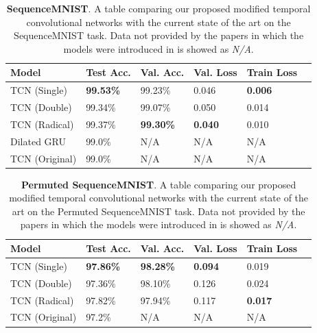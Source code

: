 \documentclass[a4paper, twoside]{article}
\begin{document}
\begin{table}[h]
\begin{center}
    \begin{tabular}{| l | l | l | l | l | l |}
    \hline
    Model & Test Acc. & Val. Acc. & Val. Loss & Train Loss\\ \hline \hline
    TCN (Single) & \textbf{99.53\%} & 99.23\% & 0.046 & \textbf{0.006} \\ \hline
    TCN (Double) & 99.34\% & 99.07\% & 0.050 & 0.014 \\ \hline
    TCN (Radical) & 99.37\% & \textbf{99.30\%} & \textbf{0.040} & 0.010 \\ \hline
    Dilated GRU \cite{dilatedgru} & 99.0\% & N/A & N/A & N/A \\ \hline
    TCN (Original) \cite{tcn} & 99.0\% & N/A & N/A & N/A \\ \hline
    \end{tabular}
    \caption{\textbf{SequenceMNIST}. A table comparing our proposed modified temporal convolutional networks with the current state of the art on the SequenceMNIST task. Data not provided by the papers in which the models were introduced in is showed as \textit{N/A}.} \label{tabseqmnist}
\end{center}
\end{table}

\begin{table}[h]
\begin{center}
    \begin{tabular}{| l | l | l | l | l | l |}
    \hline
    Model & Test Acc. & Val. Acc. & Val. Loss & Train Loss\\ \hline \hline
    TCN (Single) & \textbf{97.86\%} & \textbf{98.28\%} & \textbf{0.094}  & 0.019 \\ \hline
    TCN (Double) & 97.36\% & 98.10\% & 0.126  & 0.024 \\ \hline
    TCN (Radical) & 97.82\% & 97.94\% & 0.117  & \textbf{0.017} \\ \hline
    TCN (Original) \cite{tcn} & 97.2\% & N/A & N/A & N/A \\ \hline
    \end{tabular}
    \caption{\textbf{Permuted SequenceMNIST}. A table comparing our proposed modified temporal convolutional networks with the current state of the art on the Permuted SequenceMNIST task. Data not provided by the papers in which the models were introduced in is showed as \textit{N/A}.} \label{tabpmnist}
\end{center}
\end{table}
\end{document}
